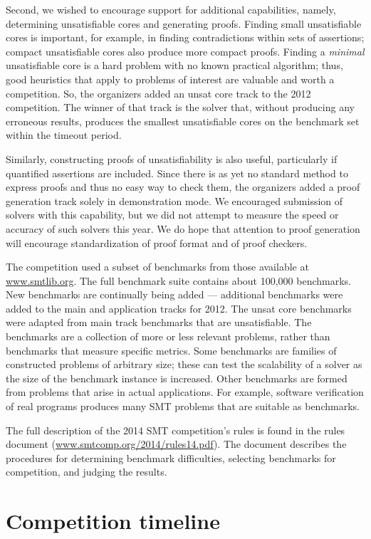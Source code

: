 \documentclass[twosize,11pt]{article}
\begin{document}
Second, we
wished to encourage support for additional capabilities, namely, determining unsatisfiable cores and generating proofs.
Finding small unsatisfiable cores is important, for example, in finding contradictions within sets of assertions; compact unsatisfiable cores also produce more compact proofs. Finding a {\em minimal} unsatisfiable core is a hard problem with no known practical algorithm;
thus, good heuristics that apply to problems of interest are valuable and worth a competition. So, the organizers added
an unsat core track to the 2012 competition. The winner of that track is the solver that, without producing any erroneous results, produces the smallest unsatisfiable cores on the benchmark set within the timeout period.

Similarly, constructing proofs of unsatisfiability is also useful, particularly if quantified assertions are included.
Since there is as yet no standard method to express proofs and thus no easy way to check them, the organizers added a proof generation track solely in demonstration mode. We encouraged submission of solvers with this capability, but we did not attempt to measure the speed or accuracy of such solvers this year. We do hope that
attention to proof generation will encourage standardization of proof format and of proof checkers.

The competition used a subset of benchmarks from those available at \url{www.smtlib.org}. The full benchmark suite contains about 100,000 benchmarks. New benchmarks are continually being added --- additional benchmarks were added to the main and application tracks for 2012. The unsat core benchmarks were adapted from main track benchmarks that are unsatisfiable. The benchmarks are a collection of more or less relevant problems, rather than benchmarks that measure specific metrics.
Some benchmarks are families of constructed problems of arbitrary size; these can test the scalability of a solver as
the size of the benchmark instance is increased. Other benchmarks are formed from problems that arise in actual 
applications. For example, software verification of real programs produces many SMT problems that are suitable as benchmarks.

The full description of the 2014 SMT competition's rules is found in the rules document (\url{www.smtcomp.org/2014/rules14.pdf}). The document describes the procedures for determining benchmark difficulties, selecting benchmarks for competition, and judging the results.

\section{Competition timeline}
\label{sec:timeline}
\end{document}
